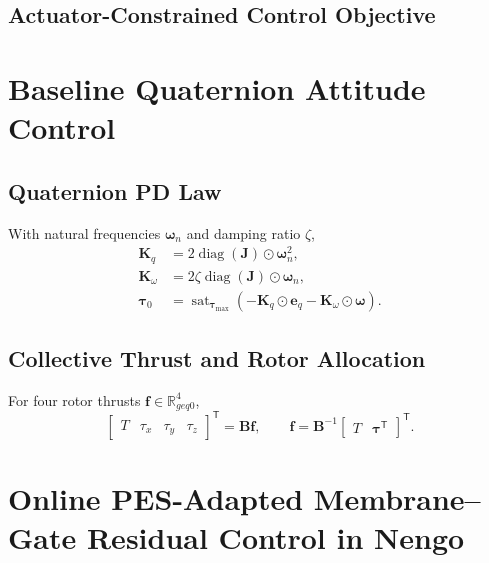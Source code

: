 \documentclass[letterpaper,10pt,conference]{ieeeconf}
\newcommand{\R}{\mathbb{R}}
\newcommand{\T}{^{\mathsf T}}
\newcommand{\sat}{\operatorname{sat}}
\begin{document}
\subsection{Actuator-Constrained Control Objective}


\section{Baseline Quaternion Attitude Control}
\label{sec:baseline}

\subsection{Quaternion PD Law}

With natural frequencies $\bm\omega_n$ and damping ratio $\zeta$,
\begin{align}
    \bm K_q &= 2\operatorname{diag}(\bm J)
        \odot\bm\omega_n^2, \\
    \bm K_{\omega} &= 2\zeta\operatorname{diag}(\bm J)
        \odot\bm\omega_n, \\
    \bm\tau_0 &= \sat_{\bm\tau_{\max}}
        \left(-\bm K_q\odot\bm e_q
        -\bm K_{\omega}\odot\bm\omega\right).
\end{align}

\subsection{Collective Thrust and Rotor Allocation}

For four rotor thrusts $\bm f\in\R_{geq0}^{4}$,
\begin{equation}
    \begin{bmatrix}T&\tau_x&\tau_y&\tau_z\end{bmatrix}\T
    =\bm B\bm f,
    \qquad
    \bm f=\bm B^{-1}
    \begin{bmatrix}T&\bm\tau\T\end{bmatrix}\T.
\end{equation}


\section{Online PES-Adapted Membrane--Gate Residual Control in Nengo}
\label{sec:cmg_nengo}
\end{document}
